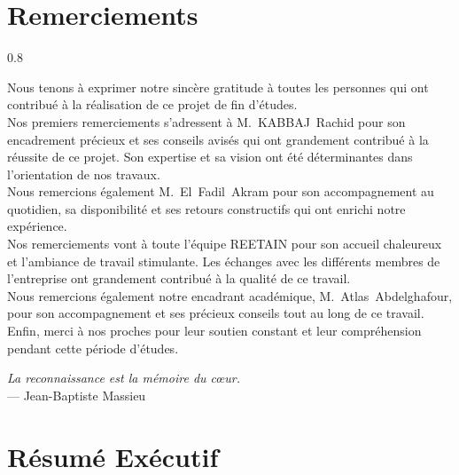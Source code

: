 \documentclass[12pt,a4paper,openany,oneside]{report}
\begin{document}
\chapter*{Remerciements}
\thispagestyle{plain}
\begin{spacing}{0.8}
\large

Nous tenons à exprimer notre sincère gratitude à toutes les personnes qui ont contribué à la réalisation de ce projet de fin d'études.\\[0.8em]

Nos premiers remerciements s'adressent à M.~KABBAJ~Rachid pour son encadrement précieux et ses conseils avisés qui ont grandement contribué à la réussite de ce projet. Son expertise et sa vision ont été déterminantes dans l'orientation de nos travaux.\\[0.8em]

Nous remercions également M.~El~Fadil~Akram pour son accompagnement au quotidien, sa disponibilité et ses retours constructifs qui ont enrichi notre expérience.\\[0.8em]

Nos remerciements vont à toute l'équipe REETAIN pour son accueil chaleureux et l'ambiance de travail stimulante. Les échanges avec les différents membres de l'entreprise ont grandement contribué à la qualité de ce travail.\\[0.8em]

Nous remercions également notre encadrant académique, M.~Atlas~Abdelghafour, pour son accompagnement et ses précieux conseils tout au long de ce travail.\\[1em]

Enfin, merci à nos proches pour leur soutien constant et leur compréhension pendant cette période d'études.\\[1.5em]

\begin{flushright}
    \textit{La reconnaissance est la mémoire du cœur.}\\
    \small{— Jean-Baptiste Massieu}
\end{flushright}

\end{spacing}
\vspace*{0.5cm}

\chapter*{Résumé Exécutif}
\end{document}
